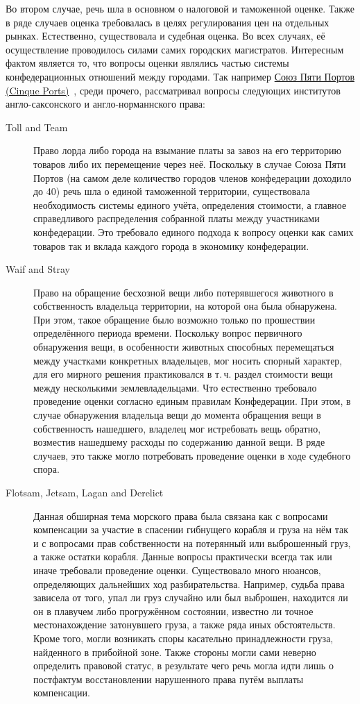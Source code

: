 \documentclass[12pt]{scrartcl}
\begin{document}
Во втором случае, речь шла в основном о налоговой и таможенной оценке. Также в ряде случаев оценка требовалась в целях регулирования цен на отдельных рынках. Естественно, существовала и судебная оценка. Во всех случаях, её осуществление проводилось силами самих городских магистратов. Интересным фактом является то, что вопросы оценки являлись частью системы конфедерационных отношений между городами. Так например \href{https://www.britannica.com/topic/Cinque-Ports}{Союз Пяти Портов (Cinque Ports)}~\cite{cinqueports}, среди прочего, рассматривал вопросы следующих институтов англо-саксонского и англо-норманнского права:
\begin{description}
    \item[Toll and Team] Право лорда либо города на взымание платы за завоз на его территорию товаров либо их перемещение через неё. Поскольку в случае Союза Пяти Портов (на самом деле количество городов членов конфедерации доходило до 40) речь шла о единой таможенной территории, существовала необходимость системы единого учёта, определения стоимости, а главное справедливого распределения собранной платы между участниками конфедерации. Это требовало единого подхода к вопросу оценки как самих товаров так и вклада каждого города в экономику конфедерации.
    \item[Waif and Stray] Право на обращение бесхозной вещи либо потерявшегося животного в собственность владельца территории, на которой она была обнаружена. При этом, такое обращение было возможно только по прошествии определённого периода времени. Поскольку вопрос первичного обнаружения вещи, в особенности животных способных перемещаться между участками конкретных владельцев, мог носить спорный характер, для его мирного решения практиковался в т.\,ч. раздел стоимости вещи между несколькими землевладельцами. Что естественно требовало проведение оценки согласно единым правилам Конфедерации. При этом, в случае обнаружения владельца вещи до момента обращения вещи в собственность нашедшего, владелец мог истребовать вещь обратно, возместив нашедшему расходы по содержанию данной вещи. В ряде случаев, это также могло потребовать проведение оценки в ходе судебного спора.
    \item[Flotsam, Jetsam, Lagan and Derelict] Данная обширная тема морского права была связана как с вопросами компенсации за участие в спасении гибнущего корабля и груза на нём так и с вопросами прав собственности на потерянный или выброшенный груз, а также остатки корабля. Данные вопросы практически всегда так или иначе требовали проведение оценки. Существовало много нюансов, определяющих дальнейших ход разбирательства. Например, судьба права зависела от того, упал ли груз случайно или был выброшен, находится ли он в плавучем либо прогружённом состоянии, известно ли точное местонахождение затонувшего груза, а также ряда иных обстоятельств. Кроме того, могли возникать споры касательно принадлежности груза, найденного в прибойной зоне. Также стороны могли сами неверно определить правовой статус, в результате чего речь могла идти лишь о постфактум восстановлении нарушенного права путём выплаты компенсации.
\end{description}
\end{document}
